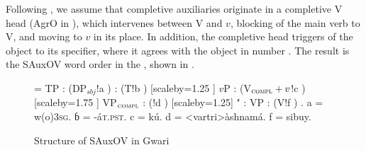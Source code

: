 \documentclass[output=paper,newtxmath,modfonts,nonflat,draftmode]{langsci/langscibook}
\begin{document}
%

Following \citet{kandy03}, we assume that completive auxiliaries originate in a completive V head (AgrO in \citet{kandy03}), which intervenes between V and $v$, blocking  of the main verb to V, and moving to $v$ in its place. In addition, the completive head triggers  of the object to its specifier, where it agrees with the object in number . The result is the SAuxOV word order in the , shown in .

\begin{figure}
{\scriptsize \jtree[xunit=2.5em,yunit=1.25em]
\! = {TP}
: ({DP$_{sbj}$}!a ) 
: ({T}!b ) [scaleby=1.25 ] {$v$P}
: ({V$_\textsc{compl}+v$}!c ) [scaleby=1.75 ] {VP$_\textsc{compl}$}
: ({}!d ) [scaleby=1.25] 
"{} : {} {VP}
: ({V}!f ) {\sout{}}.
\!a = {w(o)}{\textsc{3sg}}.
ɓ = {-á}{\textsc{t.pst}}.
\!c = {kú}{}.
\!d = <vartri>{àshnamá}{}.
\!f = {si}{buy}.
\endjtree}
\vspace{1.75em}
\caption{Structure of SAuxOV in Gwari}
\label{fig:sande:Gwari-OV}
\end{figure}
\end{document}
